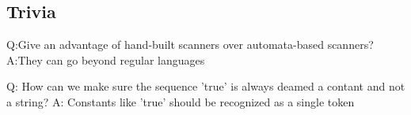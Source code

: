 \subsection{Trivia}
Q:Give an advantage of hand-built scanners over automata-based scanners? 
A:They can go beyond regular languages

Q: How can we make sure the sequence 'true' is always deamed a contant and not a string?
A: Constants like 'true' should be recognized as a single token